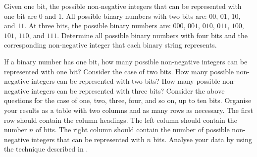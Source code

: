 \documentclass[a4paper,oneside,12pt]{article}
\begin{document}
\begin{problem}
\begin{packedenum}
  \item\label{subprob:exponential:binary_4_bits}
    Given one bit, the possible non-negative integers that can be
    represented with one bit are $0$ and $1$.  All possible binary
    numbers with two bits are: $00$, $01$, $10$, and $11$.  At three
    bits, the possible binary numbers are: $000$, $001$, $010$, $011$,
    $100$, $101$, $110$, and $111$.  Determine all possible binary
    numbers with four bits and the corresponding non-negative integer
    that each binary string represents.

  \item\label{subprob:exponential:binary_how_many_integers}
    If a binary number has one bit, how many possible non-negative
    integers can be represented with one bit?  Consider the case of
    two bits.  How many possible non-negative integers can be
    represented with two bits?  How many possible non-negative
    integers can be represented with three bits?  Consider the above
    questions for the case of one, two, three, four, and so on, up to
    ten bits.  Organise your results as a table with two columns and
    as many rows as necessary.  The first row should contain the
    column headings.  The left column should contain the number $n$ of
    bits.  The right column should contain the number of possible
    non-negative integers that can be represented with $n$ bits.
    Analyse your data by using the technique described in
    .


\end{packedenum}
\end{problem}
\end{document}
